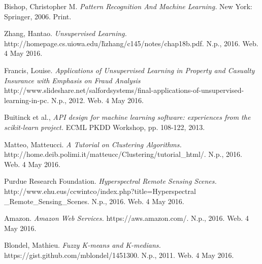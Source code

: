 \documentclass[journal]{IEEEtran}
\begin{document}
\begin{thebibliography}{1}

  Bishop, Christopher M. \emph{Pattern Recognition And Machine Learning.} New York: Springer, 2006. Print.

  Zhang, Hantao. \emph{Unsupervised Learning.} http://homepage.cs.uiowa.edu/\~hzhang/c145/notes/chap18b.pdf. N.p., 2016. Web. 4 May 2016.

  Francis, Louise. \emph{Applications of Unsupervised Learning in Property and Casualty Insurance with Emphasis on Fraud Analysis} http://www.slideshare.net/salfordsystems/final-applications-of-unsupervised-learning-in-pc. N.p., 2012. Web. 4 May 2016.

  Buitinck et al., \emph{API design for machine learning software: experiences from the scikit-learn project.} ECML PKDD Workshop, pp. 108-122, 2013.

  Matteo, Matteucci. \emph{A Tutorial on Clustering Algorithms.} http://home.deib.polimi.it/matteucc/Clustering/tutorial\_html/. N.p., 2016. Web. 4 May 2016.

  Purdue Research Foundation. \emph{Hyperspectral Remote Sensing Scenes.} http://www.ehu.eus/ccwintco/index.php?title=Hyperspectral \_Remote\_Sensing\_Scenes. N.p., 2016. Web. 4 May 2016.

  Amazon. \emph{Amazon Web Services.} https://aws.amazon.com/. N.p., 2016. Web. 4 May 2016.

  Blondel, Mathieu. \emph{Fuzzy K-means and K-medians.} https://gist.github.com/mblondel/1451300. N.p., 2011. Web. 4 May 2016.

\end{thebibliography}
\end{document}
